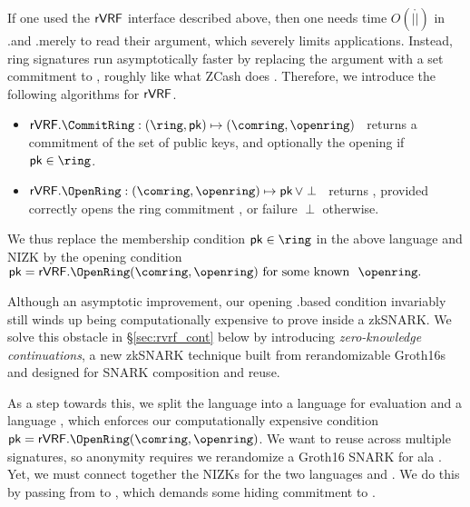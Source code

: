 
If one used the ${\mathsf{rVRF}}$ interface described above, then one needs time
$O(|\ring|)$ in \rVRF.\rSign and \rVRF.\rVerify merely to read their \ring
argument, which severely limits applications.
Instead, ring signatures run asymptotically faster by replacing the \ring
argument with a set commitment to \ring, roughly like what ZCash does \cite{zcash_protocol}. Therefore, we introduce the following algorithms for $ {\mathsf{rVRF}} $.
\begin{itemize} 
	\item $\rVRF.\CommitRing : (\ring,\pk) \mapsto (\comring,\openring)$ \,
	returns a commitment of the set \ring of public keys, and
	optionally the opening \openring if $\pk \in \ring$.
	\item $\rVRF.\OpenRing : (\comring,\openring) \mapsto \pk \, \lor \perp$ \,
	returns \pk, provided \openring correctly opens
	the ring commitment \comring, or failure $\perp$ otherwise.
\end{itemize}

We thus replace the membership condition $\pk \in \ring$ in the above
language and NIZK by the opening condition
$ \pk = \rVRF.\OpenRing(\comring,\openring) \textrm{\ for some known \ } \openring \mathperiod $
%


Although an asymptotic improvement, our opening \rVRF.\OpenRing based condition invariably
still winds up being computationally expensive to prove inside a zkSNARK.
We solve this obstacle in \S\ref{sec:rvrf_cont} below by introducing
{\em zero-knowledge continuations}, a new zkSNARK technique built from
rerandomizable Groth16s \cite{Groth16} and designed for SNARK composition and reuse.

As a step towards this, we split the language \Lrvrf into a language
\Leval for \rVRF evaluation and a language \Lring, which enforces our
computationally expensive condition $\pk = \rVRF.\OpenRing(\comring,\openring)$.
We want to reuse \Lring across multiple \rVRF signatures, so anonymity
requires we rerandomize a Groth16 SNARK for \Lring
ala \cite[Theorem 3, Appendix C, pp. 31]{RandomizationGroth16}.
%
Yet, we must connect together the NIZKs for the two languages  \Leval and \Lring. We do this by passing \pk from \Lring to \Leval, which
demands some hiding commitment \compk to \pk.

